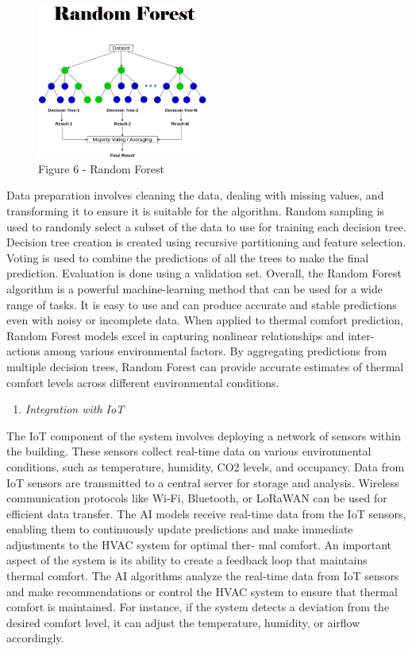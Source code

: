 \begin{figure}[H]
	\centering
	\includegraphics[width=0.5\textwidth]{media/ict/image22}
	\caption*{Figure 6 - Random Forest}
\end{figure}

\begin{multicols}{2}
Data preparation involves cleaning the data, dealing with missing
values, and transforming it to ensure it is suitable for the algorithm.
Random sampling is used to randomly select a subset of the data to use
for training each decision tree. Decision tree creation is created using
recursive partitioning and feature selection. Voting is used to combine
the predictions of all the trees to make the final prediction.
Evaluation is done using a validation set. Overall, the Random Forest
algorithm is a powerful machine-learning method that can be used for a
wide range of tasks. It is easy to use and can produce accurate and
stable predictions even with noisy or incomplete data. When applied to
thermal comfort prediction, Random Forest models excel in capturing
nonlinear relationships and inter- actions among various environmental
factors. By aggregating predictions from multiple decision trees, Random
Forest can provide accurate estimates of thermal comfort levels across
different environmental conditions.

\begin{enumerate}[leftmargin=*]
\def\labelenumi{\Alph{enumi}.}
\setcounter{enumi}{7}
\item
  \emph{Integration with IoT}
\end{enumerate}

The IoT component of the system involves deploying a network of sensors
within the building. These sensors collect real-time data on various
environmental conditions, such as temperature, humidity, CO2 levels, and
occupancy. Data from IoT sensors are transmitted to a central server for
storage and analysis. Wireless communication protocols like Wi-Fi,
Bluetooth, or LoRaWAN can be used for efficient data transfer. The AI
models receive real-time data from the IoT sensors, enabling them to
continuously update predictions and make immediate adjustments to the
HVAC system for optimal ther- mal comfort. An important aspect of the
system is its ability to create a feedback loop that maintains thermal
comfort. The AI algorithms analyze the real-time data from IoT sensors
and make recommendations or control the HVAC system to ensure that
thermal comfort is maintained. For instance, if the system detects a
deviation from the desired comfort level, it can adjust the temperature,
humidity, or airflow accordingly.


\end{multicols}

